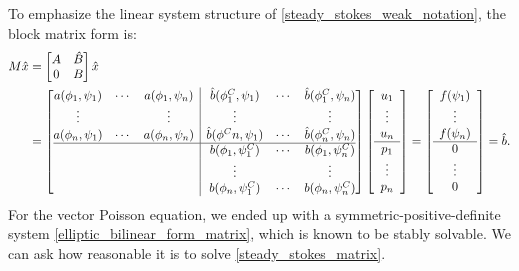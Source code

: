 \documentclass[11pt,a4paper]{memoir}
\begin{document}
To emphasize the linear system structure of \eqref{steady_stokes_weak_notation}, the block matrix form is:
\begin{equation}\label{steady_stokes_matrix}
\begin{split}
    M\hat{x}
    &= \begin{bmatrix}
            A & \hat{B} \\
            0 & B
    \end{bmatrix}\hat{x} \\
    &= \left[\begin{array}{@{}ccc|ccc@{}}
            a(\phi_1, \psi_1) & \cdots & a(\phi_1, \psi_n)     & \hat{b}(\phi^C_1, \psi_1) & \cdots & \hat{b}(\phi^C_1, \psi_n) \\
            \vdots & & \vdots                                  & \vdots & & \vdots \\
            a(\phi_n, \psi_1) & \cdots & a(\phi_n, \psi_n)     & \hat{b}(\phi^Cn, \psi_1) & \cdots & \hat{b}(\phi^C_n, \psi_n) \\
            \hline
            & & & b(\phi_1, \psi^C_1) & \cdots & b(\phi_1, \psi^C_n) \\
            & & & \vdots & & \vdots \\
            & & & b(\phi_n, \psi^C_1) & \cdots & b(\phi_n, \psi^C_n)
    \end{array}\right]
    \left[\begin{array}{c} u_1 \\ \vdots \\ u_n \\ \hline p_1 \\ \vdots \\ p_n \end{array}\right]
    =
    \left[\begin{array}{c} f(\psi_1) \\ \vdots \\ f(\psi_{n}) \\ \hline 0 \\ \vdots \\ 0 \end{array}\right]
    = \hat{b}.
\end{split}
\end{equation}
For the vector Poisson equation, we ended up with a symmetric-positive-definite system \eqref{elliptic_bilinear_form_matrix}, which is known to be stably solvable.
We can ask how reasonable it is to solve \eqref{steady_stokes_matrix}.
\end{document}
